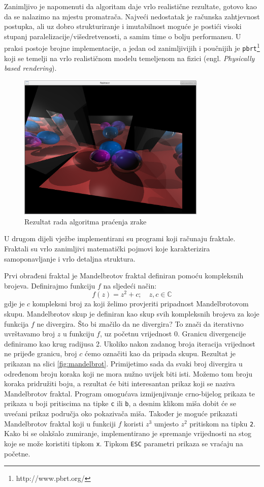 \documentclass[a4paper,12pt]{article}
\begin{document}
Zanimljivo je napomenuti da algoritam daje vrlo realistične rezultate, gotovo kao da se nalazimo
na mjestu promatrača. Najveći nedostatak je računska zahtjevnost postupka, ali uz dobro
strukturiranje i imutabilnost moguće je postići visoki stupanj paralelizacije/višedretvenosti,
a samim time o bolju performansu. U praksi postoje brojne implementacije, a jedan od zanimljivijih
i poučnijih je {\tt pbrt}\footnote{http://www.pbrt.org/} koji se temelji na vrlo realističnom
modelu temeljenom na fizici (engl. {\sl Physically based rendering}).

\begin{figure}[H]
  \centering
  \includegraphics[width=0.8\textwidth]{img/simple_scene.png}
  \caption{Rezultat rada algoritma praćenja zrake}
  \label{fig:raytracer}
\end{figure}

U drugom dijeli vježbe implementirani su programi koji računaju fraktale. Fraktali su vrlo
zanimljivi matematički pojmovi koje karakterizira samoponavljanje i vrlo detaljna struktura.

Prvi obrađeni fraktal je Mandelbrotov fraktal definiran pomoću kompleksnih brojeva.
Definirajmo funkciju $f$ na sljedeći način:
\[
f(z) = z^2 + c;\quad z, c \in \mathbb{C}
\]
gdje je $c$ kompleksni broj za koji želimo provjeriti pripadnost Mandelbrotovom skupu.
Mandelbrotov skup je definiran kao skup svih kompleksnih brojeva za koje funkcija $f$ ne
divergira. Što bi značilo da ne divergira? To znači da iterativno uvrštavamo broj $z$ u funkciju
$f$, uz početnu vrijednost 0. Granicu divergencije definiramo kao krug radijusa 2. Ukoliko
nakon zadanog broja iteracija vrijednost ne prijeđe granicu, broj $c$ ćemo označiti kao da pripada
skupu. Rezultat je prikazan na slici \ref{fig:mandelbrot}. Primijetimo sada da svaki broj divergira
u određenom broju koraka koji ne mora nužno uvijek biti isti. Možemo tom broju koraka pridružiti boju,
a rezultat će biti interesantan prikaz koji se naziva Mandelbrotov fraktal.
Program omogućava izmijenjivanje crno-bijelog prikaza te prikaza u boji
pritiscima na tipke {\tt c} ili {\tt b}, a desnim klikom miša dobit će se
uvećani prikaz područja oko pokazivača miša. Također je moguće prikazati
Mandelbrotov fraktal koji u funkciji $f$ koristi $z^3$ umjesto $z^2$ pritiskom
na tipku {\tt 2}. Kako bi se olakšalo zumiranje, implementirano je spremanje
vrijednosti na stog koje se može koristiti tipkom {\tt x}. Tipkom {\tt ESC}
parametri prikaza se vraćaju na početne.
\end{document}
